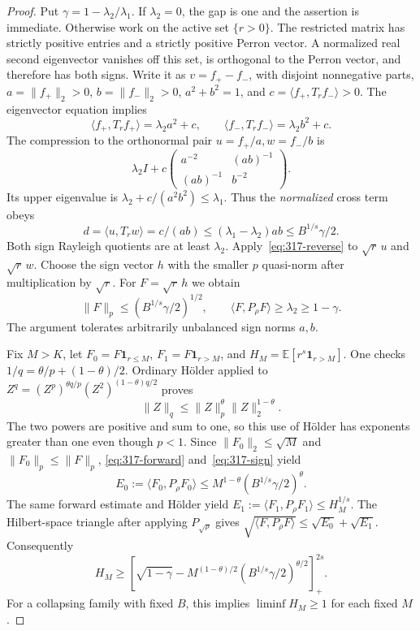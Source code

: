 \begin{proof}
Put $\gamma=1-\lambda_2/\lambda_1$. If $\lambda_2=0$, the gap is one
and the assertion is immediate. Otherwise work on the active set
$\{r>0\}$. The restricted matrix has strictly positive entries and a
strictly positive Perron vector. A normalized real second eigenvector
vanishes off this set, is orthogonal to the Perron vector, and therefore
has both signs. Write it as $v=f_+-f_-$, with disjoint nonnegative parts,
$a=\|f_+\|_2>0$, $b=\|f_-\|_2>0$, $a^2+b^2=1$, and
$c=\langle f_+,T_rf_-\rangle>0$. The eigenvector equation implies
\[
 \langle f_+,T_rf_+\rangle=\lambda_2a^2+c,\qquad
 \langle f_-,T_rf_-\rangle=\lambda_2b^2+c.
\]
The compression to the orthonormal pair $u=f_+/a,w=f_-/b$ is
\[
 \lambda_2I+c\begin{pmatrix}a^{-2}&(ab)^{-1}\\(ab)^{-1}&b^{-2}\end{pmatrix}.
\]
Its upper eigenvalue is $\lambda_2+c/(a^2b^2)\le\lambda_1$.
Thus the \emph{normalized} cross term obeys
\[
 d=\langle u,T_rw\rangle=c/(ab)
       \le(\lambda_1-\lambda_2)ab\le B^{1/s}\gamma/2.
\]
Both sign Rayleigh quotients are at least $\lambda_2$.
Apply~\eqref{eq:317-reverse} to $\sqrt r\,u$ and $\sqrt r\,w$.
Choose the sign vector $h$ with the smaller $p$ quasi-norm after
multiplication by $\sqrt r$. For $F=\sqrt r\,h$ we obtain
\begin{equation}\label{eq:317-sign}
 \|F\|_p\le(B^{1/s}\gamma/2)^{1/2},\qquad
 \langle F,P_\rho F\rangle\ge\lambda_2\ge1-\gamma.
\end{equation}
The argument tolerates arbitrarily unbalanced sign norms $a,b$.

Fix $M>K$, let $F_0=F\mathbf1_{r\le M}$,
$F_1=F\mathbf1_{r>M}$, and $H_M=\mathbb E[r^s\mathbf1_{r>M}]$.
One checks $1/q=\theta/p+(1-\theta)/2$. Ordinary H\"older applied to
$Z^q=(Z^p)^{\theta q/p}(Z^2)^{(1-\theta)q/2}$ proves
\[
 \|Z\|_q\le\|Z\|_p^\theta\|Z\|_2^{1-\theta}.
\]
The two powers are positive and sum to one, so this use of H\"older has
exponents greater than one even though $p<1$.
Since $\|F_0\|_2\le\sqrt M$ and $\|F_0\|_p\le\|F\|_p$,
\eqref{eq:317-forward} and~\eqref{eq:317-sign} yield
\[
 E_0:=\langle F_0,P_\rho F_0\rangle
       \le M^{1-\theta}(B^{1/s}\gamma/2)^\theta.
\]
The same forward estimate and H\"older yield
$E_1:=\langle F_1,P_\rho F_1\rangle\le H_M^{1/s}$.
The Hilbert-space triangle after applying $P_{\sqrt\rho}$ gives
$\sqrt{\langle F,P_\rho F\rangle}\le\sqrt{E_0}+\sqrt{E_1}$.
Consequently
\begin{equation}\label{eq:317-escape}
 H_M\ge\left[\sqrt{1-\gamma}
 -M^{(1-\theta)/2}(B^{1/s}\gamma/2)^{\theta/2}\right]_+^{2s}.
\end{equation}
For a collapsing family with fixed $B$, this implies
$\liminf H_M\ge1$ for each fixed $M$.


\end{proof}
